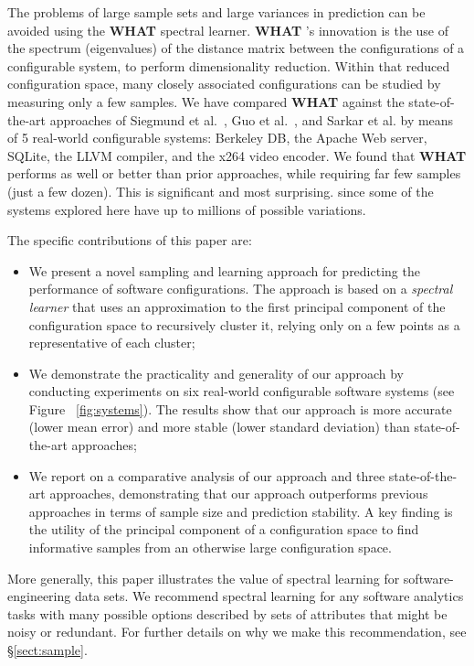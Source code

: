 \documentclass{sig-alternative}
\newcommand{\bi}{\begin{itemize}}%
\newcommand{\ei}{\end{itemize}}
\newcommand{\tion}[1]{\S\ref{sect:#1}}
\newcommand{\what}{{\bf WHAT }}
\begin{document}
The problems of large sample sets and large variances in prediction can be avoided using the \what spectral learner.  
{\what}'s innovation is  the use of the spectrum (eigenvalues) of the distance matrix
between the configurations of a configurable system, to perform dimensionality reduction. Within that
reduced configuration space, many closely associated configurations can be studied
by measuring only a few samples.
We have compared \what against the state-of-the-art approaches of Siegmund et al.~\cite{siegmund2012predicting}, Guo et al.~\cite{guo2013variability}, and Sarkar et al. \cite{sarkar2015cost} by means of 5 real-world configurable systems: Berkeley DB,  the Apache Web server, SQLite, the LLVM compiler, and the x264 video encoder.
We found that \what performs as well or better than prior approaches,
while  requiring far few samples (just a few dozen).
This is significant and most surprising.  since some of the systems explored here have up to millions of possible variations. 

The specific contributions of this paper are:
\bi
\item We present a novel sampling and learning approach for predicting the performance of software configurations. The approach is based on a
{\em spectral
learner} that uses an approximation to the first principal component of the configuration space to recursively cluster it, relying only on a few points as a representative of each cluster;
\item We demonstrate the practicality and generality of our approach by conducting experiments on six real-world configurable software systems (see Figure ~\ref{fig:systems}). The results show that our approach is more accurate (lower mean error) and more stable (lower standard deviation) than state-of-the-art approaches;
\item We report on a comparative analysis of our approach and three state-of-the-art approaches, demonstrating that our approach outperforms previous approaches in terms of sample size and prediction stability. A key finding is the utility of the principal component of a configuration space to  find informative samples from an otherwise large configuration space.
\ei
More generally, this paper illustrates the value of spectral learning for software-engineering data sets. We recommend spectral learning for any software analytics
tasks with many possible options described by sets of attributes
that might be noisy or redundant. For further details on why we make this recommendation, see \tion{sample}.
\end{document}
